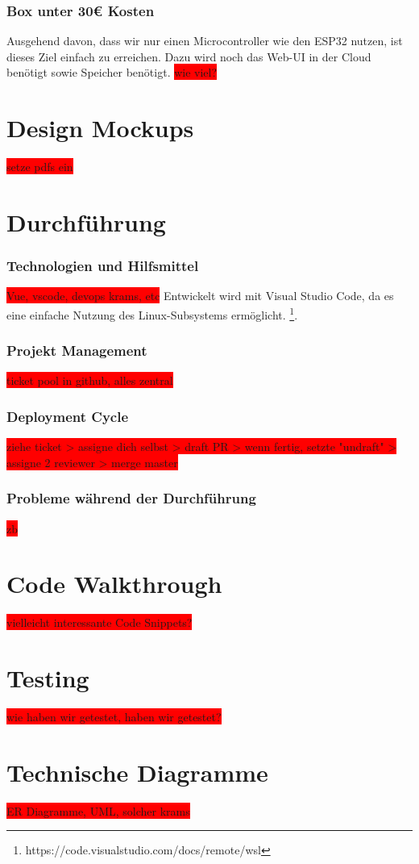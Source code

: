 \documentclass[10pt, a4paper, draft]{article}
\begin{document}
\subsubsection{Box unter 30€ Kosten}
Ausgehend davon, dass wir nur einen Microcontroller wie den ESP32 nutzen, ist dieses Ziel einfach zu erreichen.
Dazu wird noch das Web-UI in der Cloud benötigt sowie Speicher benötigt. \colorbox{red}{wie viel?}

\section{Design Mockups}
\colorbox{red}{setze pdfs ein}

\section{Durchführung}
\subsubsection{Technologien und Hilfsmittel}
\colorbox{red}{Vue, vscode, devops krams, etc}
Entwickelt wird mit Visual Studio Code, da es eine einfache Nutzung des Linux-Subsystems ermöglicht. \footnote{https://code.visualstudio.com/docs/remote/wsl}.

\subsubsection{Projekt Management}
\colorbox{red}{ticket pool in github, alles zentral}

\subsubsection{Deployment Cycle}
\colorbox{red}{ziehe ticket > assigne dich selbst > draft PR > wenn fertig, setzte "undraft" > assigne 2 reviewer > merge master}

\subsubsection{Probleme während der Durchführung}
\colorbox{red}{zb }
\section{Code Walkthrough}
\colorbox{red}{vielleicht interessante Code Snippets?}
\section{Testing}
\colorbox{red}{wie haben wir getestet, haben wir getestet?}
\section{Technische Diagramme}
\colorbox{red}{ER Diagramme, UML, solcher krams}
 
\end{document}
